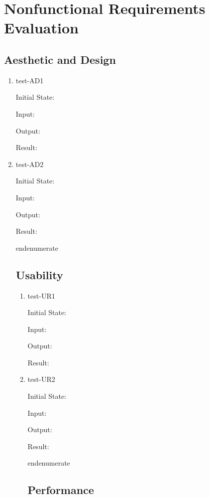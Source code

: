 \documentclass[12pt, titlepage]{article}
\begin{document}
\section{Nonfunctional Requirements Evaluation} \label{section:4}

\subsection{Aesthetic and Design} \label{section:4.1}

\begin{enumerate}

  \item{test-AD1} \label{test-AD1}

  Initial State:

  Input:

  Output:

  Result:

  \item{test-AD2} \label{test-AD2}

  Initial State:

  Input:

  Output:

  Result:

end{enumerate}

\subsection{Usability} \label{section:4.2}

\begin{enumerate}

  \item{test-UR1} \label{test-UR1}

  Initial State:

  Input:

  Output:

  Result:

  \item{test-UR2} \label{test-UR2}

  Initial State:

  Input:

  Output:

  Result:

end{enumerate}

\subsection{Performance} \label{section:4.3}


\end{enumerate}
\end{enumerate}
\end{document}
